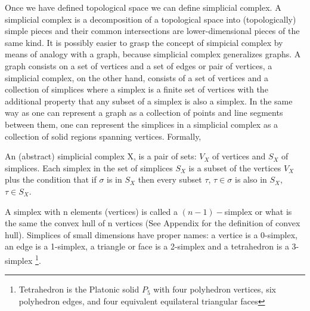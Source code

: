 \documentclass[onecollarge,runningheads]{svjour2}
\begin{document}

Once we have defined topological space we can define simplicial complex. A simplicial complex is a decomposition of a topological space into (topologically) simple pieces and their common intersections are lower-dimensional pieces of the same kind. It is possibly easier to grasp the concept of simpicial complex by means of analogy with a graph, because  simplicial complex generalizes graphs.
A graph consists on a set of vertices and a set of edges or pair of vertices, a simplicial complex, on the other hand, consists of a set of vertices and a collection of simplices where a simplex is a finite set of vertices with the additional property that any subset of a simplex is also a simplex. In the same way as one can represent a graph as a collection of points and line segments between them, one can represent the simplices in a simplicial complex as a collection of solid regions spanning vertices. Formally, 

\begin{definition}
An (abstract) simplicial complex X, is a pair of sets: $V_X$ of vertices and $S_X$ of simplices. Each simplex in the set of simplices $S_X$ is a subset of the vertices $V_X$ plus the condition that if $\sigma$ is in $S_X$ then every subset $\tau$, $\tau \in \sigma$ is also in $S_X$, $\tau \in S_X$. 
\end{definition}

A simplex with n elements (vertices) is called a $(n-1)-$simplex or what is the same the convex hull of n vertices (See Appendix for the definition of convex hull). Simplices of small dimensions have proper names: a vertice is a 0-simplex, an edge is a 1-simplex, a triangle or face is a 2-simplex and a tetrahedron is a 3-simplex \footnote{Tetrahedron is the Platonic solid $P_5$ with four polyhedron vertices, six polyhedron edges, and four equivalent equilateral triangular faces}. 
\end{document}
